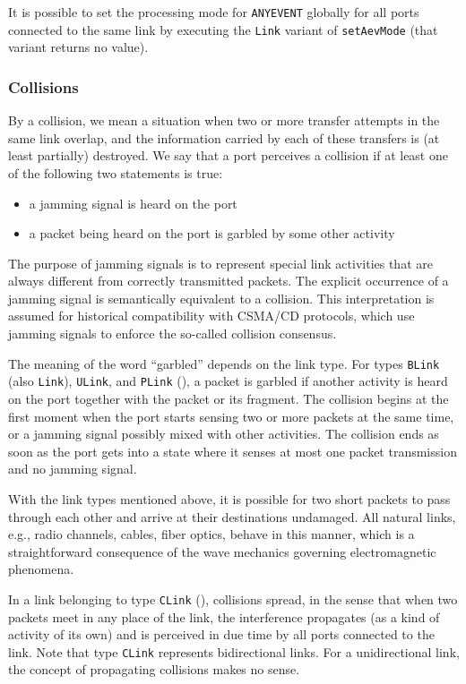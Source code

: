 It is possible to set the processing mode for {\tt ANYEVENT} globally for all
ports connected to the same link by executing the {\tt Link} variant of
{\tt setAevMode} (that variant returns no value).

\subsubsection{Collisions}
\label{rm_po_wr_co}

By a collision, we mean a situation when two or more transfer attempts in
the same link overlap, and the information carried by each of these transfers
is (at least partially) destroyed.
We say that a port perceives a collision if at least one of the following two
statements is true:

\begin{itemize}
\item
a jamming signal is heard on the port
\item
a packet being heard on the port is garbled by some other activity
\end{itemize}

The purpose of jamming signals is to represent special link activities that
are always different from correctly transmitted packets.
The explicit occurrence of a jamming signal is semantically
equivalent to a collision.
This interpretation is assumed for historical
compatibility with CSMA/CD protocols,
which use jamming signals to enforce the so-called collision consensus.

The meaning of the word ``garbled'' depends on the link type.
For types {\tt BLink} (also {\tt Link}),
{\tt ULink}, and {\tt PLink} (), a packet is garbled
if another activity is heard on the port together with the packet or its
fragment.
The collision begins at the first moment when the port starts sensing two
or more packets at the same time, or a jamming signal possibly mixed
with other activities.
The collision ends as soon as the port gets into a state where it
senses at most one packet transmission and no jamming signal.

With the link types mentioned above, it is possible for two short packets
to pass through each other and arrive at their destinations undamaged.
All natural links, e.g., radio channels, cables, fiber optics, behave in
this manner, which is a straightforward consequence of the
wave mechanics governing electromagnetic phenomena.

In a link belonging to type {\tt CLink} (),
collisions spread, in the sense that when two
packets meet in any place of the link, the interference propagates
(as a kind of activity of its own) and is perceived in due time by all
ports connected to the link.
Note that type {\tt CLink} represents bidirectional links.
For a unidirectional link, the concept of propagating collisions makes no
sense.

